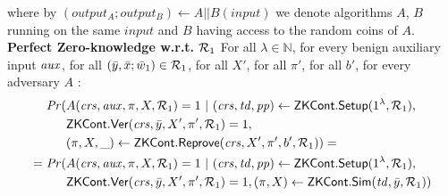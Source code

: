 \begin{definition}[ZK Continuations]
\noindent %
where by $(\mathit{output_{A}};\mathit{output_{B}}) \leftarrow A || B(\mathit{input})$ we denote algorithms $A$, $B$  running on the same 
$\mathit{input}$ and $B$ having access to the random coins of $A$. \\

\noindent \textbf{Perfect Zero-knowledge w.r.t. $\mathcal{R}_1$} For all $\lambda \in \mathbb{N}$, for every benign auxiliary input $\mathit{aux}$, 
for all  $(\bar{y}, \bar{x}; \bar{w}_1) \in \mathcal{R}_1$, for all $X'$, for all $\pi'$, for all $b'$, for every adversary $A$ :
\begin{align*}
\mathit{Pr}(& A(\mathit{crs}, \mathit{aux}, \pi, X, \mathcal{R}_1) = 1 \ | \ (\mathit{crs}, \mathit{td}, \mathit{pp}) \leftarrow {\ensuremath{\mathsf{ZKCont}}}.{\mathsf{Setup}} (1^{\lambda}, \mathcal{R}_1), \\
                  & {\mathsf{ZKCont}}.{\mathsf{Ver}}(\mathit{crs}, \bar{y}, X', \pi', \mathcal{R}_1) = 1, \\
                  & (\pi, X, \_) \leftarrow {\ensuremath{\mathsf{ZKCont}}}.{\mathsf{Reprove}} (\mathit{crs}, X', \pi', b', \mathcal{R}_1)) =  \\
= \mathit{Pr}(& A(\mathit{crs}, \mathit{aux}, \pi, X, \mathcal{R}_1) = 1 \ | \ (\mathit{crs}, \mathit{td}, \mathit{pp}) \leftarrow {\ensuremath{\mathsf{ZKCont}}}.{\mathsf{Setup}} (1^{\lambda}, \mathcal{R}_1), \\ 
                     & {\mathsf{ZKCont}}.{\mathsf{Ver}}(\mathit{crs}, \bar{y}, X', \pi', \mathcal{R}_1) = 1, (\pi, X) \leftarrow {\ensuremath{\mathsf{ZKCont}}}.{\mathsf{Sim}}(\mathit{td}, \bar{y}, \mathcal{R}_1))
\end{align*}

\begin{comment}
\begin{align*}
\mathit{Pr}(& A(\crs, \realaux, \pi', X', \relone) = 1 \ | \ (\crs, \pp) \leftarrow \ZKCont.\Setup (1^{\lambda}), \\
                  & (\crs, \crs) \leftarrow \ZKCont.\Gen(\crs, \relone), \\ 
                  & (\pi', X', \_) \leftarrow \ZKCont.\Reprove (\crs, X, \pi, b, \relone), \\
                  &  \ZKCont.\Verify(\crs, \bary, X, \pi, \relone) = 1) =  \\
= \mathit{Pr}(& A(\crs, \realaux, \pi', X', \relone) = 1 \ | \ (\crs, \pp) \leftarrow \ZKCont.\Setup (1^{\lambda}), \\ 
                     & (\crs, \crsvk) \leftarrow \ZKCont.\Gen(\crs, \relone), (\pi', X') \leftarrow \ZKCont.\Sim(\tw, \bary, \relone) \\ 
                     &  \ZKCont.\Verify(\crsvk, \bary, X, \pi, \relone) = 1)
\end{align*}
\end{comment}
 

\end{definition}
